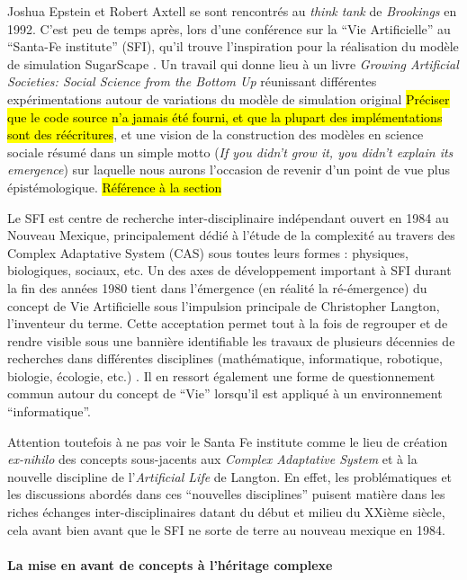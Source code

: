 Joshua Epstein et Robert Axtell se sont rencontrés au \textit{think tank} de \textit{Brookings} en 1992. C'est peu de temps après, lors d'une conférence sur la \enquote{Vie Artificielle} au \foreignquote{english}{Santa-Fe institute} (SFI), qu'il trouve l'inspiration pour la réalisation du modèle de simulation SugarScape . Un travail qui donne lieu à un livre \textit{Growing Artificial Societies: Social Science from the Bottom Up} réunissant différentes expérimentations autour de variations du modèle de simulation original \hl{Préciser que le code source n'a jamais été fourni, et que la plupart des implémentations sont des réécritures}, et une vision de la construction des modèles en science sociale résumé dans un simple motto (\textit{If you didn’t grow it, you didn’t explain its emergence}) sur laquelle nous aurons l’occasion de revenir d'un point de vue plus épistémologique. \hl{Référence à la section}


Le SFI est centre de recherche inter-disciplinaire indépendant ouvert en 1984 au Nouveau Mexique, principalement dédié à l'étude de la complexité au travers des Complex Adaptative System (CAS) sous toutes leurs formes : physiques, biologiques, sociaux, etc. Un des axes de développement important à SFI durant la fin des années 1980 tient dans l'émergence (en réalité la ré-émergence) du concept de Vie Artificielle sous l'impulsion principale de Christopher Langton, l'inventeur du terme. Cette acceptation permet tout à la fois de regrouper et de rendre visible sous une bannière identifiable les travaux de plusieurs décennies de recherches dans différentes disciplines (mathématique, informatique, robotique, biologie, écologie, etc.)  \autocite{Taylor1999}. Il en ressort également une forme de questionnement commun autour du concept de \enquote{Vie} lorsqu'il est appliqué à un environnement \enquote{informatique}.

Attention toutefois à ne pas voir le Santa Fe institute comme le lieu de création \textit{ex-nihilo} des concepts sous-jacents aux \textit{Complex Adaptative System} et à la nouvelle discipline de l'\textit{Artificial Life} de Langton. En effet, les problématiques et les discussions abordés dans ces \enquote{nouvelles disciplines} puisent matière dans les riches échanges inter-disciplinaires datant du début et milieu du XXième siècle, cela avant bien avant que le SFI ne sorte de terre au nouveau mexique en 1984.

\paragraph{La mise en avant de concepts à l'héritage complexe}
\label{p:heritage_complexe}

